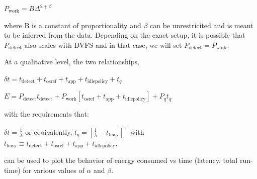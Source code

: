 $P_{\text{work}} = B \Delta^{2+\beta}$

where B is a constant of proportionality and $\beta$ can be unrestricited and is meant to be inferred from the data. Depending on the exact setup, it is possible that $P_{\text{detect}}$ also scales with DVFS and in that case, we will set $P_{\text{detect}} = P_{\text{work}}$.

At a qualitative level, the two relationships,

$\boxed{\delta t = t_{\text{detect}} + t_{\text{osref}} + t_{\text{app}} + t_{\text{idlepolicy}} + t_q}$

$\boxed{E = P_\text{detect} t_{\text{detect}} + P_{\text{work}} \left[t_{\text{osref}} + t_{\text{app}} + t_{\text{idlepolicy}}\right] + P_q t_q}$

with the requirements that:

$\delta t = \frac{1}{\lambda}$ or equivalently, $t_q = \left[\frac{1}{\lambda} - t_\text{busy}\right]^+$ with $t_{\text{busy}} \equiv t_{\text{detect}} + t_{\text{osref}} + t_{\text{app}} + t_{\text{idlepolicy}}$.

can be used to plot the behavior of energy consumed vs time (latency, total run-time) for various values of $\alpha$ and $\beta$.


